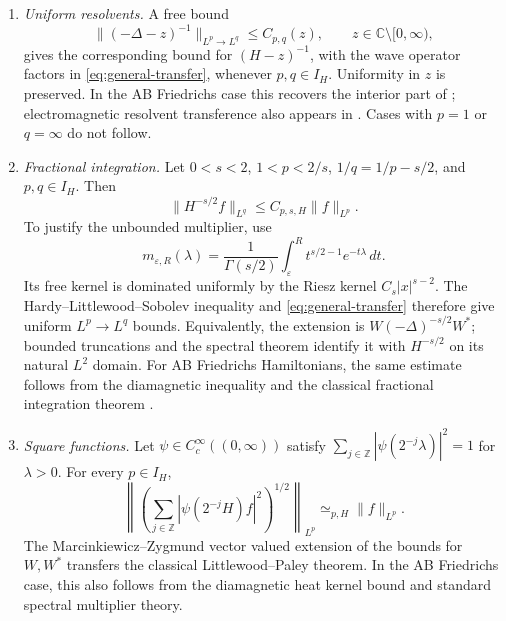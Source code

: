 \documentclass[11pt,a4paper,reqno,backref=page]{amsart}
\newcommand{\Z}{\mathbb Z}
\newcommand{\C}{\mathbb C}
\newcommand{\dd}{\,d}
\numberwithin{equation}{section}
\theoremstyle{definition}
\theoremstyle{remark}
\begin{document}
\begin{enumerate}
  \item[(a)] \emph{Uniform resolvents.} A free bound
    \begin{equation*}
      \|(-\Delta-z)^{-1}\|_{L^p\to L^q}\le C_{p,q}(z),
      \qquad z\in\C\setminus[0,\infty),
    \end{equation*}
    gives the corresponding bound for $(H-z)^{-1}$, with the
    wave operator factors in \eqref{eq:general-transfer},
    whenever $p,q\in I_H$. Uniformity in $z$ is preserved.
    In the AB Friedrichs case this recovers the interior
    part of \cite{FZZ2023}; electromagnetic resolvent
    transference also appears in \cite{FSWZZ2026}.
    Cases with $p=1$ or $q=\infty$ do not follow.

  \item[(b)] \emph{Fractional integration.} Let $0<s<2$,
    $1<p<2/s$, $1/q=1/p-s/2$, and $p,q\in I_H$. Then
    \begin{equation*}
      \|H^{-s/2}f\|_{L^q}\le C_{p,s,H}\|f\|_{L^p}.
    \end{equation*}
    To justify the unbounded multiplier, use
    \begin{equation*}
      m_{\varepsilon,R}(\lambda)
      =\frac1{\Gamma(s/2)}\int_\varepsilon^R
      t^{s/2-1}e^{-t\lambda}\dd t.
    \end{equation*}
    Its free kernel is dominated uniformly by the Riesz
    kernel $C_s|x|^{s-2}$. The
    Hardy--Littlewood--Sobolev inequality and
    \eqref{eq:general-transfer} therefore give uniform
    $L^p\to L^q$ bounds. Equivalently, the extension is
    $W(-\Delta)^{-s/2}W^*$; bounded truncations and the
    spectral theorem identify it with $H^{-s/2}$ on its
    natural $L^2$ domain. For AB Friedrichs Hamiltonians,
    the same estimate follows from the diamagnetic
    inequality and the classical fractional integration
    theorem \cite{SteinWeiss1971}.

  \item[(c)] \emph{Square functions.} Let
    $\psi\in C_c^\infty((0,\infty))$ satisfy
    $\sum_{j\in\Z}|\psi(2^{-j}\lambda)|^2=1$ for $\lambda>0$.
    For every $p\in I_H$,
    \begin{equation*}
      \left\|\left(\sum_{j\in\Z}
      |\psi(2^{-j}H)f|^2\right)^{1/2}\right\|_{L^p}
      \simeq_{p,H}\|f\|_{L^p}.
    \end{equation*}
    The Marcinkiewicz--Zygmund vector valued extension of
    the bounds for $W,W^*$ transfers the classical
    Littlewood--Paley theorem. In the AB Friedrichs case,
    this also follows from the diamagnetic heat kernel
    bound and standard spectral multiplier theory.
\end{enumerate}
\end{document}
